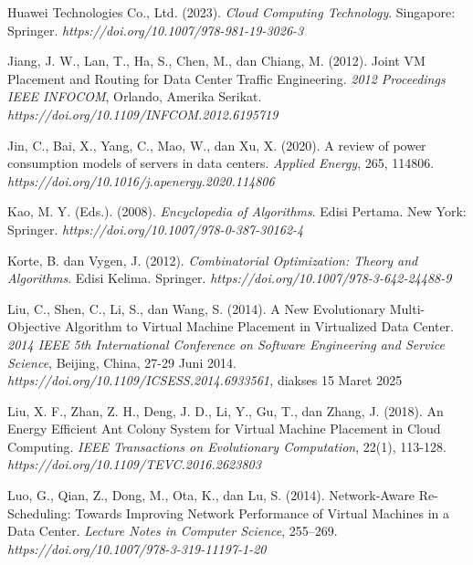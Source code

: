 \begin{thebibliography}{99}
	

	Huawei Technologies Co., Ltd. (2023). \textit{Cloud Computing Technology}. Singapore: Springer. \textit{https://doi.org/10.1007/978-981-19-3026-3}
	
	

	Jiang, J. W., Lan, T., Ha, S., Chen, M., dan Chiang, M. (2012). Joint VM Placement and Routing for Data Center Traffic Engineering. \textit{2012 Proceedings IEEE INFOCOM}, Orlando, Amerika Serikat. \textit{https://doi.org/10.1109/INFCOM.2012.6195719}
	
	

	Jin, C., Bai, X., Yang, C., Mao, W., dan Xu, X. (2020). A review of power consumption models of servers in data centers. \textit{Applied Energy}, 265, 114806. \textit{https://doi.org/10.1016/j.apenergy.2020.114806}
	
	

	Kao, M. Y. (Eds.). (2008). \textit{Encyclopedia of Algorithms}. Edisi Pertama. New York: Springer. \textit{https://doi.org/10.1007/978-0-387-30162-4}
	
	

	Korte, B. dan Vygen, J. (2012). \textit{Combinatorial Optimization: Theory and Algorithms}. Edisi Kelima. Springer. \textit{https://doi.org/10.1007/978-3-642-24488-9}
	
	

	Liu, C., Shen, C., Li, S., dan Wang, S. (2014). A New Evolutionary Multi-Objective Algorithm to Virtual Machine Placement in Virtualized Data Center. \textit{2014 IEEE 5th International Conference on Software Engineering and Service Science}, Beijing, China, 27-29 Juni 2014. \textit{https://doi.org/10.1109/ICSESS.2014.6933561,} diakses 15 Maret 2025 
	
	

	Liu, X. F., Zhan, Z. H., Deng, J. D., Li, Y., Gu, T., dan Zhang, J. (2018). An Energy Efficient Ant Colony System for Virtual Machine Placement in Cloud Computing. \textit{IEEE Transactions on Evolutionary Computation}, 22(1), 113-128. \textit{https://doi.org/10.1109/TEVC.2016.2623803}
	
	

	Luo, G., Qian, Z., Dong, M., Ota, K., dan Lu, S. (2014). Network-Aware Re-Scheduling: Towards Improving Network Performance of Virtual Machines in a Data Center. \textit{Lecture Notes in Computer Science}, 255–269. \textit{https://doi.org/10.1007/978-3-319-11197-1-20}
	

\end{thebibliography}
